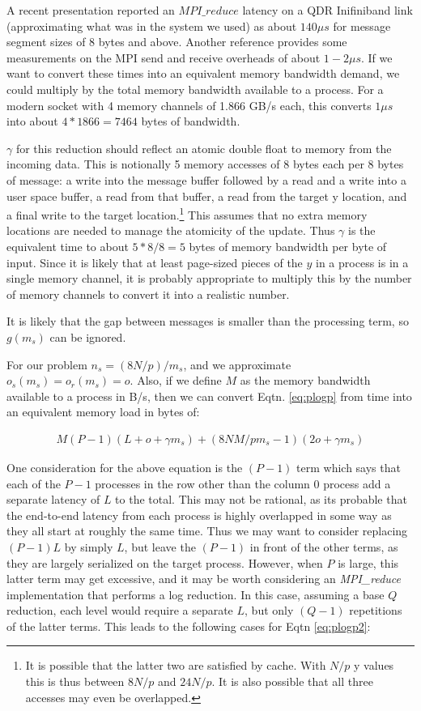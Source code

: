 A recent presentation \cite{techbib:mvapich2} reported an $MPI\_reduce$ latency on a QDR Inifiniband link (approximating what was in the system we used) as about $140\mu s$ for message segment sizes of 8 bytes and above. Another reference \cite{techbib:Doerfler2006} provides some measurements on the MPI send and receive overheads of about $1-2{\mu}s$. If we want to convert these times into an equivalent memory bandwidth demand, we could multiply by the total memory bandwidth available to a process. For a modern socket with 4 memory channels of 1.866 GB/s each, this converts $1\mu s$ into about $4*1866=7464$ bytes of bandwidth.

$\gamma$ for this reduction should reflect an atomic double float to memory from the incoming data. This is notionally 5 memory accesses of 8 bytes each per 8 bytes of message: a write into the message buffer followed by a read and a write into a user space buffer, a read from that buffer, a read from the target y location, and a final write to the target location.\footnote{It is possible that the latter two are satisfied by cache. With $N/p$ y values this is thus between $8N/p$ and $24N/p$. It is also possible that all three accesses may even be overlapped.} This assumes that no extra memory locations are needed to manage the atomicity of the update. Thus $\gamma$ is the equivalent time to about $5*8/8 = 5$ bytes of memory bandwidth per byte of input. Since it is likely that at least page-sized pieces of the $y$  in a process is in a single memory channel, it is probably appropriate to multiply this by the number of memory channels to convert it into a realistic number.

It is likely that the gap between messages is smaller than the processing term, so $g(m_s)$ can be ignored.

For our problem $n_s=(8N/p)/m_s$, and we approximate $o_s(m_s)=o_r(m_s)=o$. Also, if we define $M$ as the memory bandwidth available to a process in B/s, then we can convert Eqtn. \ref{eq:plogp} from time into an equivalent memory load in bytes of:

\begin{eqnarray}\label{eq:plogp2}
M(P-1)(L+o+\gamma m_s) 
+(8NM/pm_s-1)(2o+\gamma m_s)
\end{eqnarray}

One consideration for the above equation is the $(P-1)$ term which says that each of the $P-1$ processes in the row other than the column 0 process add a separate latency of $L$ to the total. This may not be rational, as its probable that the end-to-end latency from each process is highly overlapped in some way as they all start at roughly the same time. Thus we may want to consider replacing $(P-1)L$ by simply $L$, but leave the $(P-1)$ in front of the other terms, as they are largely serialized on the target process. However, when $P$ is large, this latter term may get excessive, and it may be worth considering an \emph{MPI\_reduce} implementation that performs a log reduction. In this case, assuming a base $Q$ reduction, each level would require a separate $L$, but only $(Q-1)$ repetitions of the latter terms. This leads to the following cases for Eqtn \ref{eq:plogp2}:

